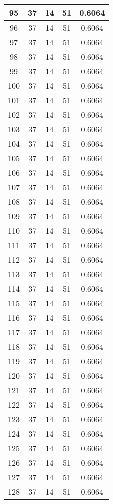 \documentclass[letterpaper, 12pt]{article}
\begin{document}
\begin{longtable}{|c|c|c|c|c|}
\hline
95 & 37 & 14 & 51 & 0.6064 \\
\hline
96 & 37 & 14 & 51 & 0.6064 \\
\hline
97 & 37 & 14 & 51 & 0.6064 \\
\hline
98 & 37 & 14 & 51 & 0.6064 \\
\hline
99 & 37 & 14 & 51 & 0.6064 \\
\hline
100 & 37 & 14 & 51 & 0.6064 \\
\hline
101 & 37 & 14 & 51 & 0.6064 \\
\hline
102 & 37 & 14 & 51 & 0.6064 \\
\hline
103 & 37 & 14 & 51 & 0.6064 \\
\hline
104 & 37 & 14 & 51 & 0.6064 \\
\hline
105 & 37 & 14 & 51 & 0.6064 \\
\hline
106 & 37 & 14 & 51 & 0.6064 \\
\hline
107 & 37 & 14 & 51 & 0.6064 \\
\hline
108 & 37 & 14 & 51 & 0.6064 \\
\hline
109 & 37 & 14 & 51 & 0.6064 \\
\hline
110 & 37 & 14 & 51 & 0.6064 \\
\hline
111 & 37 & 14 & 51 & 0.6064 \\
\hline
112 & 37 & 14 & 51 & 0.6064 \\
\hline
113 & 37 & 14 & 51 & 0.6064 \\
\hline
114 & 37 & 14 & 51 & 0.6064 \\
\hline
115 & 37 & 14 & 51 & 0.6064 \\
\hline
116 & 37 & 14 & 51 & 0.6064 \\
\hline
117 & 37 & 14 & 51 & 0.6064 \\
\hline
118 & 37 & 14 & 51 & 0.6064 \\
\hline
119 & 37 & 14 & 51 & 0.6064 \\
\hline
120 & 37 & 14 & 51 & 0.6064 \\
\hline
121 & 37 & 14 & 51 & 0.6064 \\
\hline
122 & 37 & 14 & 51 & 0.6064 \\
\hline
123 & 37 & 14 & 51 & 0.6064 \\
\hline
124 & 37 & 14 & 51 & 0.6064 \\
\hline
125 & 37 & 14 & 51 & 0.6064 \\
\hline
126 & 37 & 14 & 51 & 0.6064 \\
\hline
127 & 37 & 14 & 51 & 0.6064 \\
\hline
128 & 37 & 14 & 51 & 0.6064 \\

\end{longtable}
\end{document}
